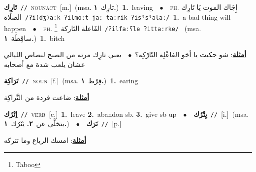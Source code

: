 \documentclass[10pt,a4paper,twoside]{article} %
\begin{document}
\begin{multicols}{2}
{{{{{{{{{\setlength\topsep{0pt}\textbf{\foreignlanguage{arabic}{تَارِك}}\ {\color{gray}\texttt{//}\color{black}}\ \textsc{noun\textunderscore act}\ [m.]\ \color{gray}(msa. \foreignlanguage{arabic}{تارِك}~\foreignlanguage{arabic}{\textbf{١.}})\color{black}\ \textbf{1.}~leaving\ \ $\bullet$\ \ \textsc{ph.} \color{gray} \foreignlanguage{arabic}{إِجَاك الموت يَا تَارِك الصلَاة}\color{black}\ {\color{gray}\texttt{/{\sffamily ʔi(dʒ)aːk ʔilmoːt jaː taːrik ʔisˤsˤalaː}/}\color{black}}\ \textbf{1.}~a bad thing will happen\ \ $\bullet$\ \ \textsc{ph.} \color{gray} \foreignlanguage{arabic}{الفَاعلة التَاركة}\color{black}\ \footnote{Taboo}\ {\color{gray}\texttt{/{\sffamily ʔilfaːʕle ʔittaːrke}/}\color{black}}\ \color{gray} (msa. \foreignlanguage{arabic}{ساقِطَة}~\foreignlanguage{arabic}{\textbf{١.}})\color{black}\ \textbf{1.}~bitch\  \begin{flushright}\color{gray}\foreignlanguage{arabic}{\textbf{\underline{\foreignlanguage{arabic}{أمثلة}}}: شو حكيت يا أخو الفاعْلِة التّارْكِة؟\ $\bullet$\ \  يعني تارِك مرته من الصبح لنصاص الليالي عشان يلعب شدة مع أصحابه}\end{flushright}\color{black}} \vspace{2mm}

{\setlength\topsep{0pt}\textbf{\foreignlanguage{arabic}{تَرَاكِة}}\ {\color{gray}\texttt{//}\color{black}}\ \textsc{noun}\ [f.]\ \color{gray}(msa. \foreignlanguage{arabic}{قِرْط}~\foreignlanguage{arabic}{\textbf{١.}})\color{black}\ \textbf{1.}~earing\  \begin{flushright}\color{gray}\foreignlanguage{arabic}{\textbf{\underline{\foreignlanguage{arabic}{أمثلة}}}: ضاعت فردة من التَّراكِة}\end{flushright}\color{black}} \vspace{2mm}

{\setlength\topsep{0pt}\textbf{\foreignlanguage{arabic}{اِتْرُك}}\ {\color{gray}\texttt{//}\color{black}}\ \textsc{verb}\ [c.]\ \textbf{1.}~leave  \textbf{2.}~abandon sb.  \textbf{3.}~give sb up\ \ $\bullet$\ \ \setlength\topsep{0pt}\textbf{\foreignlanguage{arabic}{يِتْرُك}}\ {\color{gray}\texttt{//}\color{black}}\ [i.]\ \color{gray}(msa. \foreignlanguage{arabic}{يتخلَّى عن}~\foreignlanguage{arabic}{\textbf{٢.}}  \foreignlanguage{arabic}{يَتْرُك}~\foreignlanguage{arabic}{\textbf{١.}})\color{black}\ \ $\bullet$\ \ \setlength\topsep{0pt}\textbf{\foreignlanguage{arabic}{تَرَك}}\ {\color{gray}\texttt{//}\color{black}}\ [p.]\  \begin{flushright}\color{gray}\foreignlanguage{arabic}{\textbf{\underline{\foreignlanguage{arabic}{أمثلة}}}: امسك الرياع وما تتركه}\end{flushright}\color{black}} \vspace{2mm}

}}}}}}}}
\end{multicols}
\end{document}
